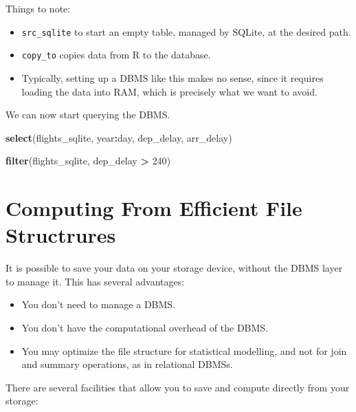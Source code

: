 \documentclass[]{book}
\newenvironment{Shaded}{\begin{snugshade}}{\end{snugshade}}
\newcommand{\KeywordTok}[1]{\textcolor[rgb]{0.13,0.29,0.53}{\textbf{#1}}}
\newcommand{\DecValTok}[1]{\textcolor[rgb]{0.00,0.00,0.81}{#1}}
\newcommand{\StringTok}[1]{\textcolor[rgb]{0.31,0.60,0.02}{#1}}
\newcommand{\OperatorTok}[1]{\textcolor[rgb]{0.81,0.36,0.00}{\textbf{#1}}}
\newcommand{\NormalTok}[1]{#1}
\providecommand{\tightlist}{%
  \setlength{\itemsep}{0pt}\setlength{\parskip}{0pt}}
\theoremstyle{definition}
\theoremstyle{definition}
\theoremstyle{definition}
\theoremstyle{remark}
\begin{document}
Things to note:

\begin{itemize}
\tightlist
\item
  \texttt{src\_sqlite} to start an empty table, managed by SQLite, at
  the desired path.
\item
  \texttt{copy\_to} copies data from R to the database.
\item
  Typically, setting up a DBMS like this makes no sense, since it
  requires loading the data into RAM, which is precisely what we want to
  avoid.
\end{itemize}

We can now start querying the DBMS.

\begin{Shaded}
\begin{Highlighting}[]
\KeywordTok{select}\NormalTok{(flights_sqlite, year}\OperatorTok{:}\NormalTok{day, dep_delay, arr_delay)}
\end{Highlighting}
\end{Shaded}

\begin{Shaded}
\begin{Highlighting}[]
\KeywordTok{filter}\NormalTok{(flights_sqlite, dep_delay }\OperatorTok{>}\StringTok{ }\DecValTok{240}\NormalTok{)}
\end{Highlighting}
\end{Shaded}

\section{Computing From Efficient File
Structrures}\label{file-structure}

It is possible to save your data on your storage device, without the
DBMS layer to manage it. This has several advantages:

\begin{itemize}
\tightlist
\item
  You don't need to manage a DBMS.
\item
  You don't have the computational overhead of the DBMS.
\item
  You may optimize the file structure for statistical modelling, and not
  for join and summary operations, as in relational DBMSs.
\end{itemize}

There are several facilities that allow you to save and compute directly
from your storage:
\end{document}
